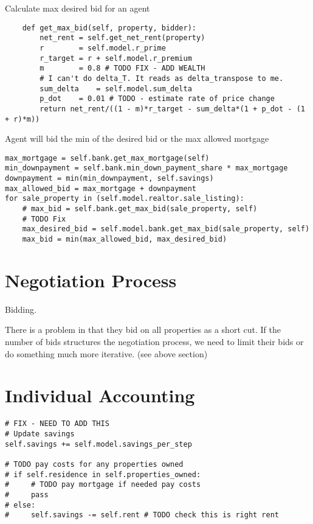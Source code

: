 Calculate max desired bid for an agent
\begin{lstlisting}
    def get_max_bid(self, property, bidder):
        net_rent = self.get_net_rent(property)
        r        = self.model.r_prime   
        r_target = r + self.model.r_premium
        m        = 0.8 # TODO FIX - ADD WEALTH
        # I can't do delta_T. It reads as delta_transpose to me.
        sum_delta    = self.model.sum_delta 
        p_dot    = 0.01 # TODO - estimate rate of price change
        return net_rent/((1 - m)*r_target - sum_delta*(1 + p_dot - (1 + r)*m))
\end{lstlisting}

Agent will bid the min of the desired bid or the max allowed mortgage
\begin{lstlisting}
max_mortgage = self.bank.get_max_mortgage(self)
min_downpayment = self.bank.min_down_payment_share * max_mortgage
downpayment = min(min_downpayment, self.savings)
max_allowed_bid = max_mortgage + downpayment
for sale_property in (self.model.realtor.sale_listing):
    # max_bid = self.bank.get_max_bid(sale_property, self)
    # TODO Fix
    max_desired_bid = self.model.bank.get_max_bid(sale_property, self)
    max_bid = min(max_allowed_bid, max_desired_bid)
\end{lstlisting}

\section{Negotiation Process}

Bidding.

There is a problem in that they bid on all properties as a short cut. If the number of bids structures the negotiation process, we need to limit their bids or do something much more iterative. (see above section)




\section{Individual Accounting}

\begin{lstlisting}
# FIX - NEED TO ADD THIS
# Update savings
self.savings += self.model.savings_per_step

# TODO pay costs for any properties owned
# if self.residence in self.properties_owned:
#     # TODO pay mortgage if needed pay costs
#     pass
# else:
#     self.savings -= self.rent # TODO check this is right rent
\end{lstlisting}